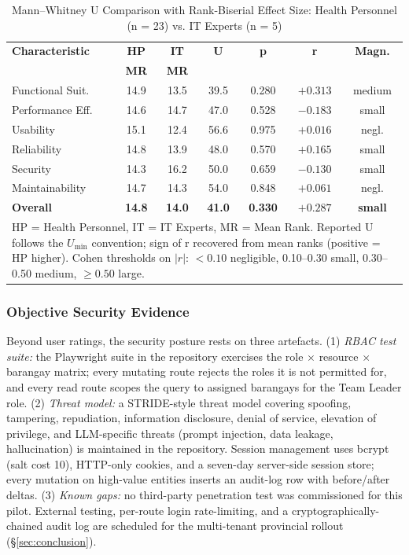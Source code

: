 \documentclass[conference]{IEEEtran}
\begin{document}
\begin{table}[!t]
\caption{Mann--Whitney U Comparison with Rank-Biserial Effect Size: Health Personnel (n = 23) vs. IT Experts (n = 5)}
\label{tab:mannwhitney}
\centering
\begin{tabular}{|l|c|c|c|c|c|c|}
\hline
\textbf{Characteristic} & \textbf{HP} & \textbf{IT} & \textbf{U} & \textbf{p} & \textbf{r} & \textbf{Magn.} \\
 & \textbf{MR} & \textbf{MR} & & & & \\
\hline
Functional Suit. & 14.9 & 13.5 & 39.5 & 0.280 & $+0.313$ & medium \\
\hline
Performance Eff. & 14.6 & 14.7 & 47.0 & 0.528 & $-0.183$ & small \\
\hline
Usability & 15.1 & 12.4 & 56.6 & 0.975 & $+0.016$ & negl. \\
\hline
Reliability & 14.8 & 13.9 & 48.0 & 0.570 & $+0.165$ & small \\
\hline
Security & 14.3 & 16.2 & 50.0 & 0.659 & $-0.130$ & small \\
\hline
Maintainability & 14.7 & 14.3 & 54.0 & 0.848 & $+0.061$ & negl. \\
\hline
\textbf{Overall} & \textbf{14.8} & \textbf{14.0} & \textbf{41.0} & \textbf{0.330} & $\boldsymbol{+0.287}$ & \textbf{small} \\
\hline
\multicolumn{7}{p{3.1in}}{\footnotesize HP = Health Personnel, IT = IT Experts, MR = Mean Rank. Reported U follows the $U_{\min}$ convention; sign of r recovered from mean ranks (positive = HP higher). Cohen thresholds on $|r|$: $< 0.10$ negligible, 0.10--0.30 small, 0.30--0.50 medium, $\geq 0.50$ large.}
\end{tabular}
\end{table}

\subsubsection{Objective Security Evidence}
Beyond user ratings, the security posture rests on three artefacts. (1) \textit{RBAC test suite:} the Playwright \cite{b52} suite in the repository exercises the role $\times$ resource $\times$ barangay matrix; every mutating route rejects the roles it is not permitted for, and every read route scopes the query to assigned barangays for the Team Leader role. (2) \textit{Threat model:} a STRIDE-style threat model covering spoofing, tampering, repudiation, information disclosure, denial of service, elevation of privilege, and LLM-specific threats (prompt injection, data leakage, hallucination) is maintained in the repository. Session management uses bcrypt (salt cost 10), HTTP-only cookies, and a seven-day server-side session store; every mutation on high-value entities inserts an audit-log row with before/after deltas. (3) \textit{Known gaps:} no third-party penetration test was commissioned for this pilot. External testing, per-route login rate-limiting, and a cryptographically-chained audit log are scheduled for the multi-tenant provincial rollout (\S\ref{sec:conclusion}).
\end{document}
